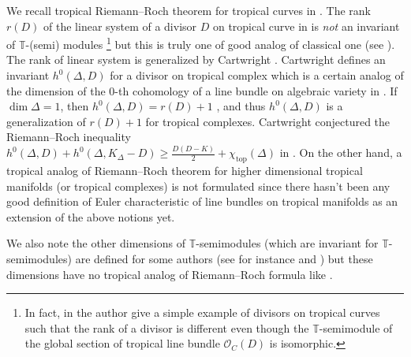 \documentclass[a4paper,dvipdfmx,reqno,12pt]{amsart}
\theoremstyle{definition}
\newcommand{\mb}[1]{\mathbb{#1}}%
\newcommand{\mcal}[1]{\mathcal{#1}}%
\newcommand{\opn}[1]{\operatorname{#1}}
\newcommand{\myfootnote}[1]{\hspace{-5pt}\footnote{#1}}
\numberwithin{equation}{section}
\begin{document}
We recall tropical Riemann--Roch theorem for tropical curves 
in \cite{gathmannRiemannRochTheoremTropical2008a}. 
The rank $r(D)$ of the linear system of a divisor $D$ 
on tropical curve in 
\cite{gathmannRiemannRochTheoremTropical2008a}
is \emph{not} an invariant of $\mb{T}$-(semi)
modules
\myfootnote{In fact, 
in \cite[Example 6.5]{yoshitomi2011generators} 
the author give a simple example of divisors on 
tropical curves such that 
the rank of a divisor is different even though 
the $\mathbb{T}$-semimodule of the global section of 
tropical line bundle $\mcal{O}_C(D)$ is isomorphic.}
but this is truly one of good analog of classical one 
(see \cite[Lemma 2.4]{MR2448666}).
The rank of linear system is generalized by Cartwright
\cite{MR4131998,MR4251610}.
Cartwright defines an invariant 
$h^{0}(\Delta,D)$ for a divisor on tropical complex
which is a certain analog of the dimension of
the $0$-th cohomology of a line bundle on algebraic 
variety in \cite[Definition 3.1]{MR4251610}.
If $\dim \Delta=1$, then $h^{0}(\Delta,D)=r(D)+1$
\cite[Proposition 3.3]{MR4251610}, and thus $h^{0}(\Delta,D)$
is a generalization of $r(D)+1$ for tropical complexes. 
Cartwright conjectured the Riemann--Roch inequality
$h^{0}(\Delta,D)+h^{0}(\Delta,K_{\Delta}-D)\geq 
\frac{D(D-K)}{2}+\chi_{\opn{top}}(\Delta)$
in \cite[Conjecture 3.6]{MR4251610}.
On the other hand, a tropical analog of Riemann--Roch theorem
for higher dimensional tropical manifolds 
(or tropical complexes) is not formulated
since there hasn't been any good definition of 
Euler characteristic of line bundles on tropical 
manifolds as an extension of the above notions yet.

We also note the other dimensions of $\mb{T}$-semimodules 
(which are invariant for $\mb{T}$-semimodules) are defined for 
some authors 
(see for instance 
\cite[Definition 2.3]{mikhalkinTropicalCurvesTheir2008a}
and \cite[p.8]{yoshitomi2011generators}) but 
these dimensions have no tropical analog of 
Riemann--Roch formula like 
\cite{MR2355607,gathmannRiemannRochTheoremTropical2008a}.
\end{document}
